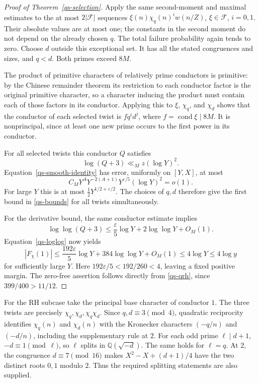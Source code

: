 \begin{proof}[Proof of Theorem~\ref{qs-selection}]
Apply the same second-moment and maximal estimates to the at
most $2|\mathcal F|$ sequences
$\xi(n)\chi_q(n)^i w(n/Z)$, $\xi\in\mathcal F$, $i=0,1$.
Their absolute values are at most one; the constants in the
second moment do not depend on the already chosen $q$.
The total failure probability again tends to zero. Choose $d$
outside this exceptional set. It has all the stated congruences
and sizes, and $q<d$. Both primes exceed $8M$.

The product of primitive characters of relatively prime
conductors is primitive: by the Chinese remainder theorem its
restriction to each conductor factor is the original primitive
character, so a character inducing the product must contain
each of those factors in its conductor. Applying this to
$\xi$, $\chi_q$, and $\chi_d$ shows that the conductor of each
selected twist is
$f q^i d^j$, where $f=\operatorname{cond}\xi\mid8M$.
It is nonprincipal, since at least one new prime occurs to the
first power in its conductor.

For all selected twists this conductor $Q$ satisfies
\[
 \log(Q+3)\ll_M z(\log Y)^2.
\]
Equation~\eqref{qs-smooth-identity} has error, uniformly on
$[Y,X]$, at most
\[
 C_M Y^A Y^{-2(A+1)}Y^{\varepsilon/5}(\log Y)^2=o(1).
\]
For large $Y$ this is at most
$\tfrac12Y^{1/2+\varepsilon/2}$.
The choices of $q,d$ therefore give the first bound in
\eqref{qs-bounds} for all twists simultaneously.

For the derivative bound, the same conductor estimate implies
\[
 \log\log(Q+3)
 \le\frac{\varepsilon}{5}\log Y+2\log\log Y+O_M(1).
\]
Equation~\eqref{qs-loglog} now yields
\[
 |F_\chi(1)|
 \le\frac{192\varepsilon}{5}\log Y
                 +384\log\log Y+O_M(1)
 \le4\log Y\le4\log y
\]
for sufficiently large $Y$. Here
$192\varepsilon/5<192/260<4$, leaving a fixed positive
margin. The zero-free assertion follows directly from
\eqref{qs-qrh}, since $399/400>11/12$.
\end{proof}

For the RH subcase take the principal base character of conductor
$1$. The three twists are precisely $\chi_q,\chi_d,\chi_q\chi_d$.
Since $q,d\equiv3\pmod4$, quadratic reciprocity identifies
$\chi_q(n)$ and $\chi_d(n)$ with the Kronecker characters
$(-q/n)$ and $(-d/n)$, including the supplementary rule at $2$.
For each odd prime $\ell\mid d+1$, $-d\equiv1\pmod\ell$,
so $\ell$ splits in $\mathbb Q(\sqrt{-d})$. The same holds for
$\ell=q$. At $2$, the congruence $d\equiv7\pmod{16}$ makes
$X^2-X+(d+1)/4$ have the two distinct roots $0,1$ modulo $2$.
Thus the required splitting statements are also supplied.

